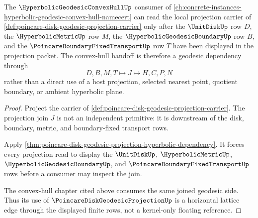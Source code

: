 \begin{lemma}
\label{lem:poincare-disk-geodesic-projection-convex-hull-forward-lattice}
The $\HyperbolicGeodesicConvexHullUp$ consumer of \autoref{ch:concrete-instances-hyperbolic-geodesic-convex-hull-namecert} can read the local projection carrier of \autoref{def:poincare-disk-geodesic-projection-carrier} only after the $\UnitDiskUp$ row $D$, the $\HyperbolicMetricUp$ row $M$, the $\HyperbolicGeodesicBoundaryUp$ row $B$, and the $\PoincareBoundaryFixedTransportUp$ row $T$ have been displayed in the projection packet. The convex-hull handoff is therefore a geodesic dependency through
$$
D,B,M,T \longmapsto J \longmapsto H,C,P,N
$$
rather than a direct use of a host projection, selected nearest point, quotient boundary, or ambient hyperbolic plane.
\end{lemma}
\begin{proof}
Project the carrier of \autoref{def:poincare-disk-geodesic-projection-carrier}. The projection join $J$ is not an independent primitive: it is downstream of the disk, boundary, metric, and boundary-fixed transport rows.

Apply \autoref{thm:poincare-disk-geodesic-projection-hyperbolic-dependency}. It forces every projection read to display the $\UnitDiskUp$, $\HyperbolicMetricUp$, $\HyperbolicGeodesicBoundaryUp$, and $\PoincareBoundaryFixedTransportUp$ rows before a consumer may inspect the join.

The convex-hull chapter cited above consumes the same joined geodesic side. Thus its use of $\PoincareDiskGeodesicProjectionUp$ is a horizontal lattice edge through the displayed finite rows, not a kernel-only floating reference.
\end{proof}
